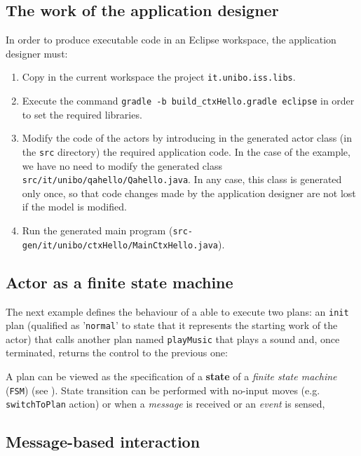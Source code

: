 \subsection{The work of the application designer}

In order to produce executable code in an Eclipse workspace, the application designer must:
 \begin{enumerate}
 \item Copy in the current workspace the project  \texttt{it.unibo.iss.libs}.
 \item Execute the command \texttt{gradle -b build\_ctxHello.gradle eclipse} in order to set the required libraries.
 \item Modify the code of the actors by introducing in the generated actor class (in the \texttt{src} directory) the required application code. In the case of the example, we have no need to modify the generated class \texttt{src/it/unibo/qahello/Qahello.java}. In any case, this class is generated only once, so that code changes made by the application designer are not lost if the model is modified.
 \item Run the generated main program (\texttt{src-gen/it/unibo/ctxHello/MainCtxHello.java}).
 \end{enumerate}



\subsection{Actor as a finite state machine}

The next example defines the behaviour of a \qa{} able to execute two plans: an \texttt{init} plan (qualified as '\texttt{normal}' to state that it represents the starting work of the actor) that calls another plan named \texttt{playMusic} that plays a sound and, once terminated, returns the control to the previous one:

  

A plan can be viewed as the specification of a \textbf{state} of a \textit{finite state machine} (\texttt{FSM}) (see ). State transition can be performed with no-input moves (e.g. \texttt{switchToPlan} action) or  when a \textit{message} is received or an \textit{event} is sensed,


\subsection{Message-based interaction}


